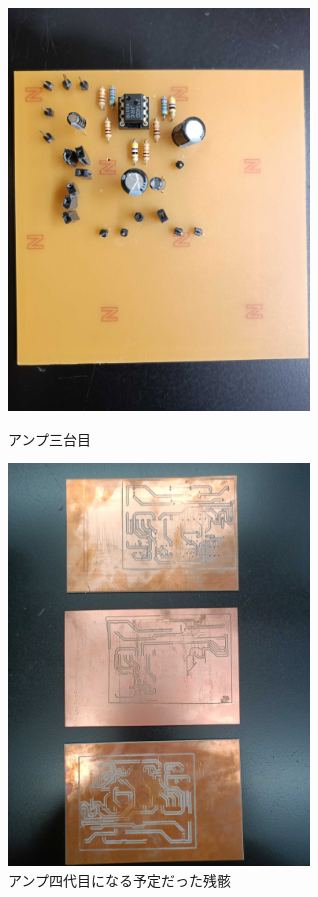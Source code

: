 \documentclass[report.tex]{subfiles}
\begin{document}
\begin{figure}[H]
	\begin{minipage}[b]{0.5\linewidth}
		\centering
		\includegraphics[width=8cm]{use/5.jpg}
		\caption{アンプ三台目}
		\label{fig:s_4}
	\end{minipage}
	\begin{minipage}[b]{0.5\linewidth}
		\centering
		\includegraphics[width=8cm]{use/6.jpg}
		\caption{アンプ四代目になる予定だった残骸}
		\label{fig:s_5}
	\end{minipage}
\end{figure}
\end{document}

